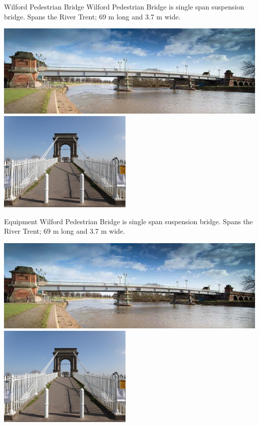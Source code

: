 \documentclass[11pt]{beamer}
\begin{document}
\begin{frame}{Wilford Pedestrian Bridge}
Wilford Pedestrian Bridge is single span suspension bridge. Spans the River Trent; 69 m long and 3.7 m wide.

	\includegraphics[height=.4\textheight]{pic/Bridge01.jpg}
		\centering
	\includegraphics[width=.4\textwidth]{pic/Bridge02.jpg} 

\end{frame}

\begin{frame}{Equipment}
Wilford Pedestrian Bridge is single span suspension bridge. Spans the River Trent; 69 m long and 3.7 m wide.

	\includegraphics[height=.4\textheight]{pic/Bridge01.jpg}
		\centering
	\includegraphics[width=.4\textwidth]{pic/Bridge02.jpg} 

\end{frame}
\end{document}
